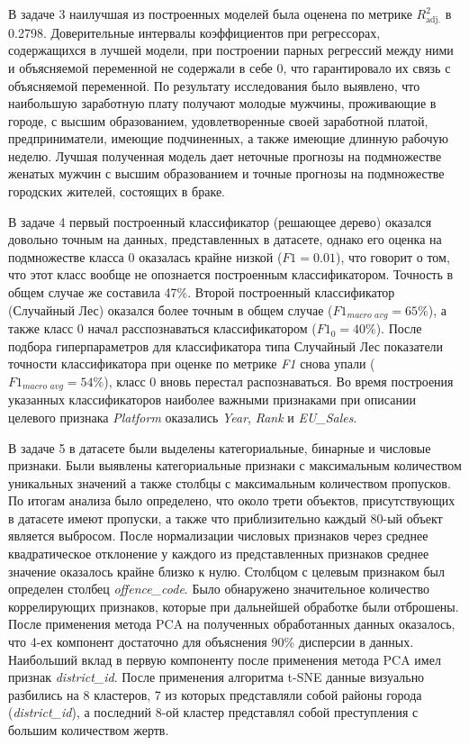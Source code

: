В задаче 3 наилучшая из построенных моделей была оценена по метрике $R^{2}_{\text{adj.}}$ в 0.2798. Доверительные интервалы коэффициентов при регрессорах, содержащихся в лучшей модели, при построении парных регрессий между ними и объясняемой переменной не содержали в себе 0, что гарантировало их связь с объясняемой переменной. По результату исследования было выявлено, что наибольшую заработную плату получают молодые мужчины, проживающие в городе, с высшим образованием, удовлетворенные своей заработной платой, предприниматели, имеющие подчиненных, а также имеющие длинную рабочую неделю. Лучшая полученная модель дает неточные прогнозы на подмножестве женатых мужчин с высшим образованием и точные прогнозы на подмножестве городских жителей, состоящих в браке.

В задаче 4 первый построенный классификатор (решающее дерево) оказался довольно точным на данных, представленных в датасете, однако его оценка на подмножестве класса 0 оказалась крайне низкой ($\textit{F1} = 0.01$), что говорит о том, что этот класс вообще не опознается построенным классификатором. Точность в общем случае же составила 47\%. Второй построенный классификатор (Случайный Лес) оказался более точным в общем случае ($\textit{F1}_{\textit{macro avg}} = 65\%$), а также класс 0 начал расспознаваться классификатором ($\textit{F1}_{0} = 40\%$). После подбора гиперпараметров для классификатора типа Случайный Лес показатели точности классификатора при оценке по метрике \textit{F1} снова упали ($\textit{F1}_{\textit{macro avg}} = 54\%$), класс 0 вновь перестал распознаваться. Во время построения указанных классификаторов наиболее важными признаками при описании целевого признака \textit{Platform} оказались \textit{Year}, \textit{Rank} и \textit{EU\_Sales}.

В задаче 5 в датасете были выделены категориальные, бинарные и числовые признаки. Были выявлены категориальные признаки с максимальным количеством уникальных значений а также столбцы с максимальным количеством пропусков. По итогам анализа было определено, что около трети объектов, присутствующих в датасете имеют пропуски, а также что приблизительно каждый 80-ый объект является выбросом. После нормализации числовых признаков через среднее квадратическое отклонение у каждого из представленных признаков среднее значение оказалось крайне близко к нулю. Столбцом с целевым признаком был определен столбец \textit{offence\_code}. Было обнаружено значительное количество коррелирующих признаков, которые при дальнейшей обработке были отброшены. После применения метода PCA на полученных обработанных данных оказалось, что 4-ех компонент достаточно для объяснения 90\% дисперсии в данных. Наибольший вклад в первую компоненту после применения метода PCA имел признак \textit{district\_id}. После применения алгоритма t-SNE данные визуально разбились на 8 кластеров, 7 из которых представляли собой районы города (\textit{district\_id}), а последний 8-ой кластер представлял собой преступления с большим количеством жертв.

